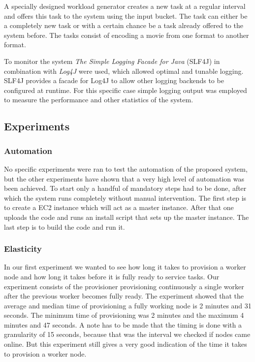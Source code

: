 \documentclass[a4paper]{IEEEtran}
\begin{document}
A specially designed workload generator creates a new task at a regular interval and offers this task to the system using the input bucket.
The task can either be a completely new task or with a certain chance be a task already offered to the system before.
The tasks consist of encoding a movie from one format to another format.

To monitor the system \emph{The Simple Logging Facade for Java} (SLF4J) in combination with \emph{Log4J} were used, which allowed optimal and tunable logging.
SLF4J provides a facade for Log4J to allow other logging backends to be configured at runtime.
For this specific case simple logging output was employed to measure the performance and other statistics of the system.

\subsection{Experiments}

\subsubsection{Automation}
No specific experiments were ran to test the automation of the proposed system, but the other experiments have shown that a very high level of automation was been achieved.
To start only a handful of mandatory steps had to be done, after which the system runs completely without manual intervention.
The first step is to create a EC2 instance which will act as a master instance.
After that one uploads the code and runs an install script that sets up the master instance.
The last step is to build the code and run it.

\subsubsection{Elasticity}

In our first experiment we wanted to see how long it takes to provision a worker node and how long it takes before it is fully ready to service tasks.
Our experiment consists of the provisioner provisioning continuously a single worker after the previous worker becomes fully ready.
The experiment showed that the average and median time of provisioning a fully working node is 2 minutes and 31 seconds.
The minimum time of provisioning was 2 minutes and the maximum 4 minutes and 47 seconds.
A note has to be made that the timing is done with a granularity of 15 seconds, because that was the interval we checked if nodes came online.
But this experiment still gives a very good indication of the time it takes to provision a worker node.
\end{document}
